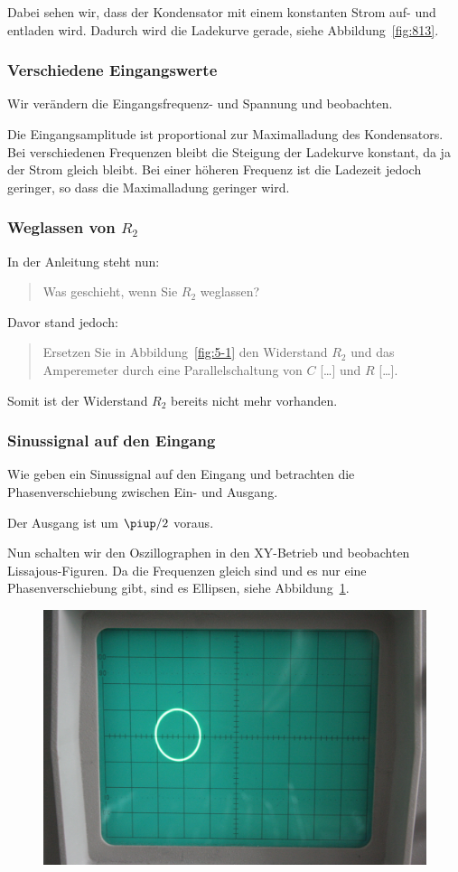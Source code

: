 Dabei sehen wir, dass der Kondensator mit einem konstanten Strom auf- und
entladen wird. Dadurch wird die Ladekurve gerade, siehe
Abbildung~\ref{fig:813}.

\subsubsection{Verschiedene Eingangswerte}

Wir verändern die Eingangsfrequenz- und Spannung und beobachten.

Die Eingangsamplitude ist proportional zur Maximalladung des Kondensators. Bei
verschiedenen Frequenzen bleibt die Steigung der Ladekurve konstant, da ja der
Strom gleich bleibt. Bei einer höheren Frequenz ist die Ladezeit jedoch
geringer, so dass die Maximalladung geringer wird.

\subsubsection{Weglassen von $R_2$}

In der Anleitung steht nun:

\begin{quote}
	Was geschieht, wenn Sie $R_2$ weglassen?
\end{quote}

Davor stand jedoch:

\begin{quote}
	Ersetzen Sie in Abbildung~\ref{fig:5-1} den Widerstand $R_2$ und das
	Amperemeter durch eine Parallelschaltung von $C$ […] und $R$ […].
\end{quote}

Somit ist der Widerstand $R_2$ bereits nicht mehr vorhanden.

\subsubsection{Sinussignal auf den Eingang}

Wie geben ein Sinussignal auf den Eingang und betrachten die Phasenverschiebung
zwischen Ein- und Ausgang.

Der Ausgang ist um $\piup/2$ voraus.

Nun schalten wir den Oszillographen in den XY-Betrieb und beobachten
Lissajous-Figuren. Da die Frequenzen gleich sind und es nur eine
Phasenverschiebung gibt, sind es Ellipsen, siehe Abbildung~\ref{fig:814}.

\begin{figure}[htbp]
	\centering
	\includegraphics[width=.45\linewidth]{Oszi_Foto/5-814.jpg}
	\caption{%
	}
	\label{fig:814}
\end{figure}

